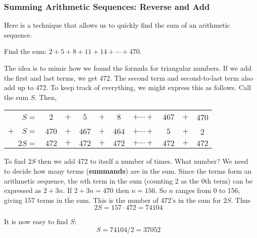 \documentclass[11pt,]{book}
\newcommand{\terminology}[1]{\textbf{#1}}
\theoremstyle{ptxplainnotitle}
\theoremstyle{ptxplaintitle}
\theoremstyle{ptxdefinitionnotitle}
\theoremstyle{ptxdefinitiontitle}
\theoremstyle{ptxdefinitionnotitle}
\theoremstyle{ptxdefinitiontitle}
\theoremstyle{ptxdefinitionnotitle}
\theoremstyle{ptxdefinitiontitle}
\theoremstyle{ptxdefinitiontitlenonumber}
\theoremstyle{ptxdefinitiontitlenonumber}
\numberwithin{equation}{chapter}
\newcommand{\hrulethin}  {\noalign{\hrule height 0.04em}}
\begin{document}
\subsubsection[{Summing Arithmetic Sequences: Reverse and Add}]{Summing Arithmetic Sequences: Reverse and Add}\label{subsubsection-1}
\hypertarget{p-188}{}%
Here is a technique that allows us to quickly find the sum of an arithmetic sequence.%
\begin{example}\label{example-7}
\hypertarget{p-189}{}%
Find the sum: \(2 + 5 + 8 + 11 + 14 + \cdots + 470\).%
\par\smallskip%
\noindent\textbf{}\hypertarget{solution-18}{}\hypertarget{p-190}{}%
The idea is to mimic how we found the formula for triangular numbers. If we add the first and last terms, we get 472. The second term and second-to-last term also add up to 472. To keep track of everything, we might express this as follows. Call the sum \(S\). Then,%
\begin{sidebyside}{1}{0}{0}{0}
\begin{sbspanel}{1}
{\centering%
\begin{tabular}{rccccccccc}
\(S  =\)&\(2\)&\(+\)&\(5\)&\(+\)&\(8\)&\(+ \cdots +\)&\(467\)&\(+\)&470\tabularnewline[0pt]
\(+ \quad S  =\)&\(470\)&\(+\)&\(467\)&\(+\)&\(464\)&\(+ \cdots +\)&\(5\)&\(+\)&2\tabularnewline\hrulethin
\(2S  =\)&\(472\)&\(+\)&\(472\)&\(+\)&\(472\)&\(+ \cdots +\)&\(472\)&\(+\)&\(472\)
\end{tabular}
\par}
\end{sbspanel}
\end{sidebyside}
\par
\hypertarget{p-191}{}%
To find \(2S\) then we add 472 to itself a number of times. What number? We need to decide how many terms (\terminology{summands}) are in the sum. Since the terms form an arithmetic sequence, the \(n\)th term in the sum (counting \(2\) as the 0th term) can be expressed as \(2 + 3n\). If \(2 + 3n = 470\) then \(n = 156\). So \(n\) ranges from 0 to 156, giving 157 terms in the sum. This is the number of 472's in the sum for \(2S\). Thus%
\begin{equation*}
2S = 157\cdot 472 = 74104
\end{equation*}
%
\par
\hypertarget{p-192}{}%
It is now easy to find \(S\):%
\begin{equation*}
S = 74104/2 = 37052
\end{equation*}
%
\end{example}
\hypertarget{p-193}{}%
\end{document}
